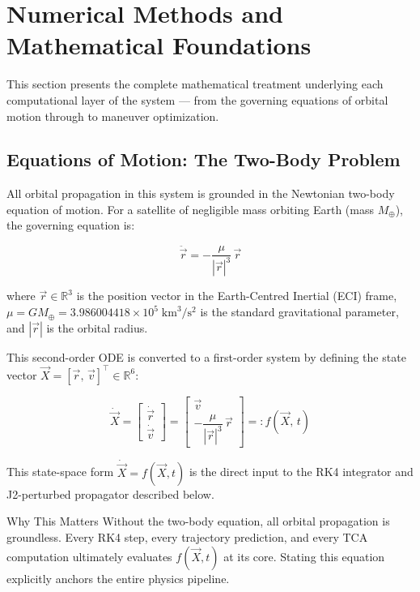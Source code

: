 \documentclass[11pt, a4paper]{article}
\begin{document}
\section{Numerical Methods and Mathematical Foundations}

This section presents the complete mathematical treatment underlying each computational
layer of the system --- from the governing equations of orbital motion through to maneuver
optimization.

\subsection{Equations of Motion: The Two-Body Problem}

All orbital propagation in this system is grounded in the Newtonian two-body equation of motion.
For a satellite of negligible mass orbiting Earth (mass $M_\oplus$), the governing equation is:

\[
  \ddot{\vec{r}} = -\frac{\mu}{|\vec{r}|^3}\,\vec{r}
\]

where $\vec{r} \in \mathbb{R}^3$ is the position vector in the Earth-Centred Inertial (ECI) frame,
$\mu = GM_\oplus = 3.986004418 \times 10^5\;\text{km}^3/\text{s}^2$ is the standard gravitational
parameter, and $|\vec{r}|$ is the orbital radius.

This second-order ODE is converted to a first-order system by defining the state vector
$\vec{X} = [\vec{r},\, \vec{v}]^\top \in \mathbb{R}^6$:

\[
  \dot{\vec{X}} =
  \begin{bmatrix} \dot{\vec{r}} \\ \dot{\vec{v}} \end{bmatrix}
  =
  \begin{bmatrix} \vec{v} \\ -\dfrac{\mu}{|\vec{r}|^3}\,\vec{r} \end{bmatrix}
  =: f(\vec{X},\, t)
\]

This state-space form $\dot{\vec{X}} = f(\vec{X}, t)$ is the direct input to the RK4 integrator
and J2-perturbed propagator described below.

\begin{layerbox}[breakable=false]{Why This Matters}
Without the two-body equation, all orbital propagation is groundless. Every RK4 step, every
trajectory prediction, and every TCA computation ultimately evaluates $f(\vec{X}, t)$ at its
core. Stating this equation explicitly anchors the entire physics pipeline.
\end{layerbox}
\end{document}
